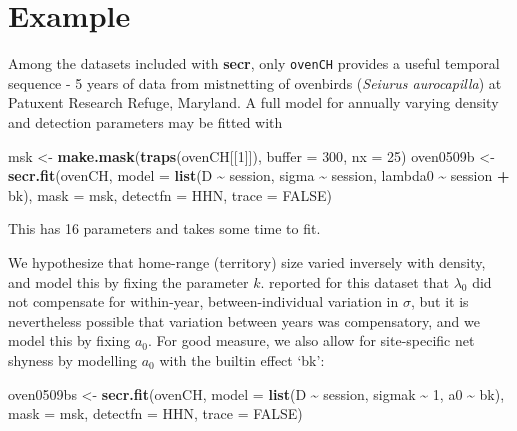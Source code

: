\documentclass[
]{book}
\newenvironment{Shaded}{\begin{snugshade}}{\end{snugshade}}
\newcommand{\AttributeTok}[1]{\textcolor[rgb]{0.13,0.29,0.53}{#1}}
\newcommand{\ConstantTok}[1]{\textcolor[rgb]{0.56,0.35,0.01}{#1}}
\newcommand{\DecValTok}[1]{\textcolor[rgb]{0.00,0.00,0.81}{#1}}
\newcommand{\FunctionTok}[1]{\textcolor[rgb]{0.13,0.29,0.53}{\textbf{#1}}}
\newcommand{\NormalTok}[1]{#1}
\newcommand{\OtherTok}[1]{\textcolor[rgb]{0.56,0.35,0.01}{#1}}
\newcommand{\SpecialCharTok}[1]{\textcolor[rgb]{0.81,0.36,0.00}{\textbf{#1}}}
\newcommand{\StringTok}[1]{\textcolor[rgb]{0.31,0.60,0.02}{#1}}
\begin{document}
\section{Example}\label{example}

Among the datasets included with \textbf{secr}, only \texttt{ovenCH} provides a useful temporal sequence - 5 years of data from mistnetting of ovenbirds (\emph{Seiurus aurocapilla}) at Patuxent Research Refuge, Maryland. A full model for annually varying density and detection parameters may be fitted with

\begin{Shaded}
\begin{Highlighting}[]
\NormalTok{msk }\OtherTok{\textless{}{-}} \FunctionTok{make.mask}\NormalTok{(}\FunctionTok{traps}\NormalTok{(ovenCH[[}\DecValTok{1}\NormalTok{]]), }\AttributeTok{buffer =} \DecValTok{300}\NormalTok{, }\AttributeTok{nx =} \DecValTok{25}\NormalTok{)}
\NormalTok{oven0509b }\OtherTok{\textless{}{-}} \FunctionTok{secr.fit}\NormalTok{(ovenCH, }\AttributeTok{model =} \FunctionTok{list}\NormalTok{(D }\SpecialCharTok{\textasciitilde{}}\NormalTok{ session, }
\NormalTok{    sigma }\SpecialCharTok{\textasciitilde{}}\NormalTok{ session, lambda0 }\SpecialCharTok{\textasciitilde{}}\NormalTok{ session }\SpecialCharTok{+}\NormalTok{ bk), }\AttributeTok{mask =}\NormalTok{ msk, }
    \AttributeTok{detectfn =} \StringTok{\textquotesingle{}HHN\textquotesingle{}}\NormalTok{, }\AttributeTok{trace =} \ConstantTok{FALSE}\NormalTok{)}
\end{Highlighting}
\end{Shaded}

This has 16 parameters and takes some time to fit.

We hypothesize that home-range (territory) size varied inversely with density, and model this by fixing the parameter \(k\). \citet{em14} reported for this dataset that \(\lambda_0\) did not compensate for within-year, between-individual variation in \(\sigma\), but it is nevertheless possible that variation between years was compensatory, and we model this by fixing \(a_0\). For good measure, we also allow for site-specific net shyness by modelling \(a_0\) with the builtin effect `bk':

\begin{Shaded}
\begin{Highlighting}[]
\NormalTok{oven0509bs }\OtherTok{\textless{}{-}} \FunctionTok{secr.fit}\NormalTok{(ovenCH, }\AttributeTok{model =} \FunctionTok{list}\NormalTok{(D }\SpecialCharTok{\textasciitilde{}}\NormalTok{ session, sigmak }\SpecialCharTok{\textasciitilde{}} \DecValTok{1}\NormalTok{,}
\NormalTok{    a0 }\SpecialCharTok{\textasciitilde{}}\NormalTok{ bk), }\AttributeTok{mask =}\NormalTok{ msk, }\AttributeTok{detectfn =} \StringTok{\textquotesingle{}HHN\textquotesingle{}}\NormalTok{, }\AttributeTok{trace =} \ConstantTok{FALSE}\NormalTok{)}
\end{Highlighting}
\end{Shaded}
\end{document}
